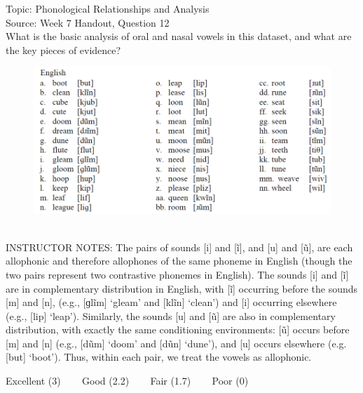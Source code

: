 \documentclass[12pt]{article}
\begin{document}
Topic: Phonological Relationships and Analysis\\
Source: Week 7 Handout, Question 12\\

What is the basic analysis of oral and nasal vowels in this dataset, and what are the key pieces of evidence?\\

\begin{figure}[H]
\includegraphics{../images/english12.png}
\end{figure}

~\\
INSTRUCTOR NOTES: The pairs of sounds [i] and [ĩ], and [u] and [ũ], are each allophonic and therefore allophones of the same phoneme in English (though the two pairs represent two contrastive phonemes in English). The sounds [i] and [ĩ] are in complementary distribution in English, with [ĩ] occurring before the sounds [m] and [n], (e.g., [ɡlĩm] ‘gleam’ and [klĩn] ‘clean’) and [i] occurring elsewhere (e.g., [lip] ‘leap’). Similarly, the sounds [u] and [ũ] are also in complementary distribution, with exactly the same conditioning environments: [ũ] occurs before [m] and [n] (e.g., [dũm] ‘doom’ and [dũn] ‘dune’), and [u] occurs elsewhere (e.g. [but] ‘boot’). Thus, within each pair, we treat the vowels as allophonic. 


\vfill
Excellent (3) ~~~ Good (2.2) ~~~ Fair (1.7) ~~~ Poor (0)
\newpage

\begin{center}
\textbf{{\color{red}{\HUGE END OF EXAM}}}\\

\end{center}
\newpage

\begin{center}
\textbf{{\color{blue}{\HUGE START OF EXAM\\}}}

\textbf{{\color{blue}{\HUGE Student ID: 80652\\}}}

\textbf{{\color{blue}{\HUGE \\}}}

\end{center}
\newpage
\end{document}
